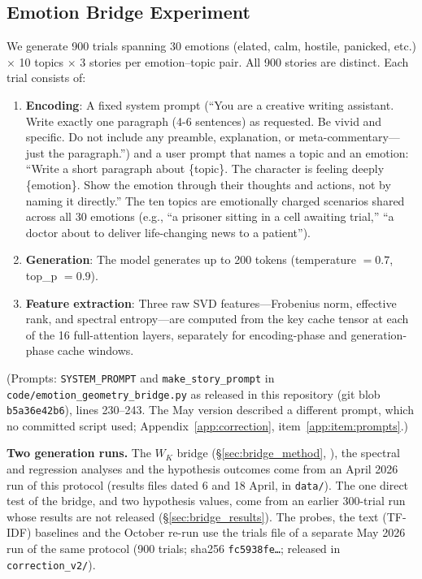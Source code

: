 \documentclass[11pt,a4paper]{article}
\begin{document}
\subsection{Emotion Bridge Experiment}
\label{sec:bridge_experiment}

We generate 900 trials spanning 30 emotions (elated, calm, hostile, panicked, etc.) $\times$ 10 topics $\times$ 3 stories per emotion--topic pair. All 900 stories are distinct. Each trial consists of:

\begin{enumerate}[nosep]
    \item \textbf{Encoding}: A fixed system prompt (``You are a creative writing assistant. Write exactly one paragraph (4-6 sentences) as requested. Be vivid and specific. Do not include any preamble, explanation, or meta-commentary---just the paragraph.'') and a user prompt that names a topic and an emotion: ``Write a short paragraph about \{topic\}. The character is feeling deeply \{emotion\}. Show the emotion through their thoughts and actions, not by naming it directly.'' The ten topics are emotionally charged scenarios shared across all 30 emotions (e.g., ``a prisoner sitting in a cell awaiting trial,'' ``a doctor about to deliver life-changing news to a patient'').
    \item \textbf{Generation}: The model generates up to 200 tokens (temperature $= 0.7$, top\_p $= 0.9$).
    \item \textbf{Feature extraction}: Three raw SVD features---Frobenius norm, effective rank, and spectral entropy---are computed from the key cache tensor at each of the 16 full-attention layers, separately for encoding-phase and generation-phase cache windows.
\end{enumerate}

(Prompts: \texttt{SYSTEM\_PROMPT} and \texttt{make\_story\_prompt} in \texttt{code/emotion\_geometry\_bridge.py} as released in this repository (git blob \texttt{b5a36e42b6}), lines 230--243. The May version described a different prompt, which no committed script used; Appendix~\ref{app:correction}, item~\ref{app:item:prompts}.)

\textbf{Two generation runs.} The $W_K$ bridge (\S\ref{sec:bridge_method}, ), the spectral and regression analyses and the hypothesis outcomes come from an April 2026 run of this protocol (results files dated 6 and 18 April, in \texttt{data/}). The one direct test of the bridge, and two hypothesis values, come from an earlier 300-trial run whose results are not released (\S\ref{sec:bridge_results}). The probes, the text (TF-IDF) baselines and the October re-run use the trials file of a separate May 2026 run of the same protocol (900 trials; sha256 \texttt{fc5938fe\ldots}; released in \texttt{correction\_v2/}).
\end{document}
